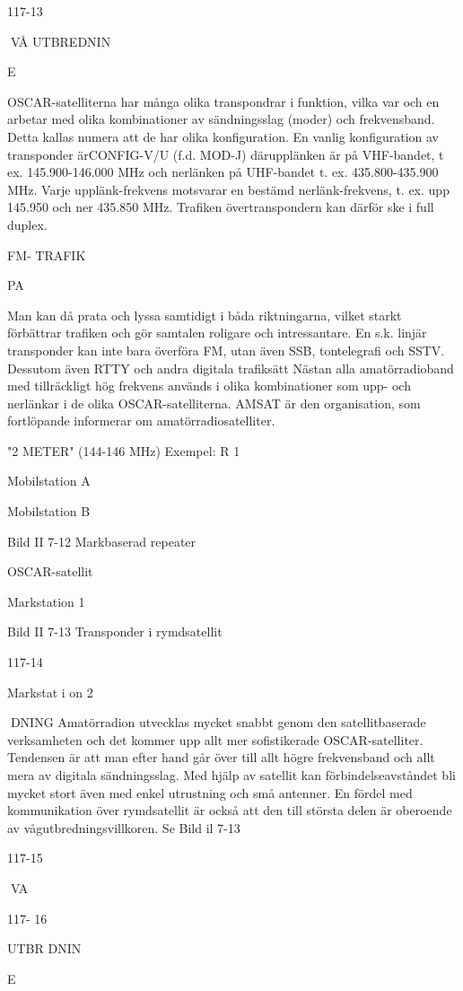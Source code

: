 117-13

VÅ UTBREDNIN

E

OSCAR-satelliterna har många olika transpondrar i funktion, vilka var och en arbetar
med olika kombinationer av sändningsslag
(moder) och frekvensband. Detta kallas numera att de har olika konfiguration.
En vanlig konfiguration av transponder
ärCONFIG-V/U (f.d. MOD-J) därupplänken
är på VHF-bandet, t ex. 145.900-146.000
MHz och nerlänken på UHF-bandet t. ex.
435.800-435.900 MHz. Varje upplänk-frekvens motsvarar en bestämd nerlänk-frekvens, t. ex. upp 145.950 och ner 435.850
MHz. Trafiken övertranspondern kan därför
ske i full duplex.

FM- TRAFIK

PA

Man kan då prata och lyssa samtidigt i
båda riktningarna, vilket starkt förbättrar trafiken och gör samtalen roligare och intressantare.
En s.k. linjär transponder kan inte bara
överföra FM, utan även SSB, tontelegrafi
och SSTV. Dessutom även RTTY och andra
digitala trafiksätt
Nästan alla amatörradioband med tillräckligt hög frekvens används i olika kombinationer som upp- och nerlänkar i de olika
OSCAR-satelliterna.
AMSAT är den organisation, som fortlöpande informerar om amatörradiosatelliter.

"2 METER" (144-146 MHz) Exempel: R 1

Mobilstation A

Mobilstation B

Bild II 7-12 Markbaserad repeater

OSCAR-satellit

Markstation 1

Bild II 7-13 Transponder i rymdsatellit

117-14

Markstat i on 2

DNING
Amatörradion utvecklas mycket snabbt
genom den satellitbaserade verksamheten
och det kommer upp allt mer sofistikerade
OSCAR-satelliter. Tendensen är att man
efter hand går över till allt högre frekvensband och allt mera av digitala sändningsslag.
Med hjälp av satellit kan förbindelseavståndet bli mycket stort även med enkel
utrustning och små antenner. En fördel med
kommunikation över rymdsatellit är också
att den till största delen är oberoende av
vågutbredningsvillkoren.
Se Bild il 7-13

117-15

VA

117- 16

UTBR DNIN

E

